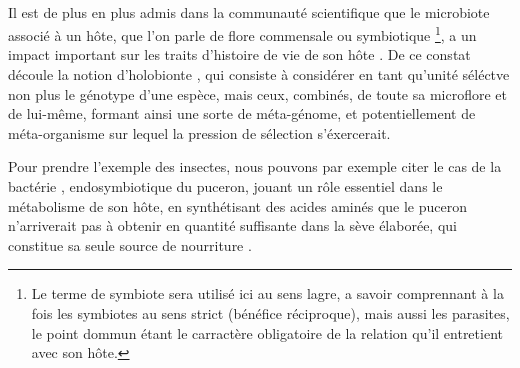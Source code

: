 
\paragraph{} %
\label{par:intro1}

Il est de plus en plus admis dans la communauté scientifique que le microbiote
associé à un hôte, que l'on parle de flore commensale ou symbiotique
\footnote{Le terme de symbiote sera utilisé ici au sens lagre, a savoir
comprennant à la fois les symbiotes au sens strict (bénéfice réciproque), mais
aussi les parasites, le point dommun étant le carractère obligatoire de la
relation qu'il entretient avec son hôte.}, a un impact important sur les
traits d'histoire de vie de son hôte \cite{feldhaar2011}. De ce constat
découle la notion d'holobionte \cite{rosenberg2007}, qui consiste à considérer
en tant qu'unité séléctve non plus le génotype d'une espèce, mais ceux,
combinés, de toute sa microflore et de lui-même, formant ainsi une sorte de
méta-génome, et potentiellement de méta-organisme sur lequel la pression de
sélection s'éxercerait.

Pour prendre l'exemple des insectes, nous pouvons par exemple citer le cas de
la bactérie ,  endosymbiotique du puceron, jouant un rôle
essentiel dans le métabolisme de son hôte,  en synthétisant des acides aminés
que le puceron n'arriverait pas à obtenir en quantité suffisante dans la sève
élaborée, qui constitue sa seule source de nourriture \cite{douglas1998}.



